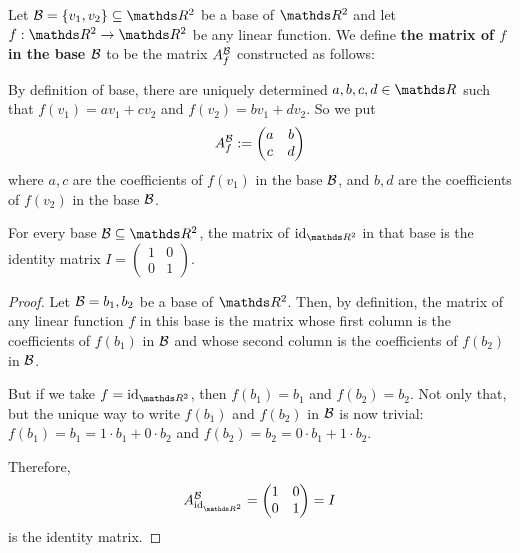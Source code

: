 \begin{df}
	Let $\mc B=\{v_1,v_2\}\subseteq \R^2$ be a base of $\R^2$ and let $f:\R^2\to\R^2$ be any linear function. We define \textbf{the matrix of $f$ in the base $\mathcal B$} to be the matrix $A_f^{\mathcal B}$ constructed as follows:
	
	By definition of base, there are uniquely determined $a,b,c,d\in \R$ such that $f(v_1)=av_1+cv_2$ and $f(v_2)=bv_1+dv_2$. So we put
	\[A_f^{\mathcal B}:=\begin{pmatrix}
	a&b\\c&d
	\end{pmatrix}\]where $a,c$ are the coefficients of $f(v_1)$ in the base $\mathcal B$, and $b,d$ are the coefficients of $f(v_2)$ in the base $\mathcal B$.
\end{df}

\begin{lemma}
	For every base $\mc B\subseteq \R^2$, the matrix of $\id_{\R^2}$ in that base is the identity matrix $I=\begin{pmatrix}
	1&0\\0&1
	\end{pmatrix}$.
\end{lemma}

\begin{proof}
	Let $\mathcal B={b_1,b_2}$ be a base of $\R^2$. Then, by definition, the matrix of any linear function $f$ in this base is the matrix whose first column is the coefficients of $f(b_1)$ in $\mathcal B$ and whose second column is the coefficients of $f(b_2)$ in $\mathcal B$.
	
	But if we take $f=\id_{\R^2}$, then $f(b_1)=b_1$ and $f(b_2)=b_2$. Not only that, but the unique way to write $f(b_1)$ and $f(b_2)$ in $\mathcal B$ is now trivial: $f(b_1)=b_1=1\cdot b_1+0\cdot b_2$ and $f(b_2)=b_2=0\cdot b_1+1\cdot b_2$.
	
	Therefore, 
	\[A_{\id_{\R^2}}^{\mc B}=\begin{pmatrix}
		1&0\\0&1
		\end{pmatrix}=I\]is the identity matrix.
\end{proof}

